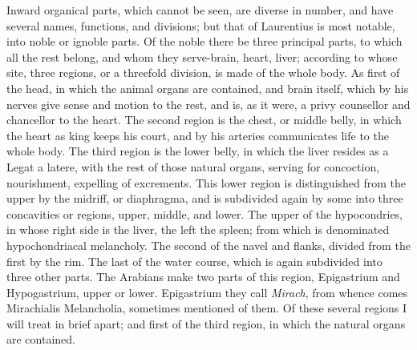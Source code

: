 {Inward organical parts, which cannot be seen, are diverse in number, and
have several names, functions, and divisions; but that of
Laurentius is most notable, into noble or ignoble parts. Of the
noble there be three principal parts, to which all the rest belong, and
whom they serve-brain, heart, liver; according to whose site, three
regions, or a threefold division, is made of the whole body. As first
of the head, in which the animal organs are contained, and brain
itself, which by his nerves give sense and motion to the rest, and is,
as it were, a privy counsellor and chancellor to the heart. The second
region is the chest, or middle belly, in which the heart as king keeps
his court, and by his arteries communicates life to the whole body. The
third region is the lower belly, in which the liver resides as a Legat
a latere, with the rest of those natural organs, serving for
concoction, nourishment, expelling of excrements. This lower region is
distinguished from the upper by the midriff, or diaphragma, and is
subdivided again by some into three concavities or regions, upper,
middle, and lower. The upper of the hypocondries, in whose right side
is the liver, the left the spleen; from which is denominated
hypochondriacal melancholy. The second of the navel and flanks, divided
from the first by the rim. The last of the water course, which is again
subdivided into three other parts. The Arabians make two parts of this
region, Epigastrium and Hypogastrium, upper or lower. Epigastrium they
call \emph{Mirach}, from whence comes Mirachialis Melancholia, sometimes
mentioned of them. Of these several regions I will treat in brief
apart; and first of the third region, in which the natural organs are
contained.

}
